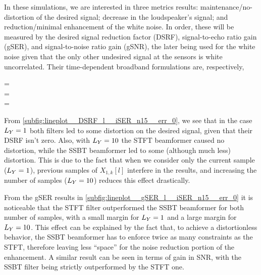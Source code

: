 In these simulations, we are interested in three metrics results: maintenance/no-distortion of the desired signal; decrease in the loudspeaker's signal; and reduction/minimal enhancement of the white noise. In order, these will be measured by the desired signal reduction factor (DSRF), signal-to-echo ratio gain (gSER), and signal-to-noise ratio gain (gSNR), the later being used for the white noise given that the only other undesired signal at the sensors is white uncorrelated. Their time-dependent broadband formulations are, respectively,
\begin{subgather}
	\dsrf[l] =  \\
	\gser[l] =  \cdot {} \\
	\gsnr[l] =  \cdot {}
\end{subgather}

From \cref{subfig:lineplot__DSRF_l__iSER_n15__err_0}, we see that in the case $\Ly = 1$ both filters led to some distortion on the desired signal, given that their DSRF isn't zero. Also, with $\Ly = 10$ the STFT beamformer caused no distortion, while the SSBT beamformer led to some (although much less) distortion. This is due to the fact that when we consider only the current sample ($\Ly = 1$), previous samples of $X_{1,k}[l]$ interfere in the results, and increasing the number of samples ($\Ly = 10$) reduces this effect drastically.

From the gSER results in \cref{subfig:lineplot__gSER_l__iSER_n15__err_0} it is noticeable that the STFT filter outperformed the SSBT beamformer for both number of samples, with a small margin for $\Ly = 1$ and a large margin for $\Ly = 10$. This effect can be explained by the fact that, to achieve a distortionless behavior, the SSBT beamformer has to enforce twice as many constraints as the STFT, therefore leaving less ``space'' for the noise reduction portion of the enhancement. A similar result can be seen in terms of gain in SNR, with the SSBT filter being strictly outperformed by the STFT one.


